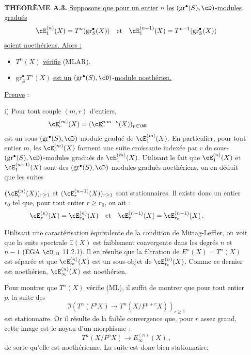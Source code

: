 \bigskip

\noindent
\textbf{THEOR\`EME A.3.} \underline{Supposons que pour un entier} $n$ \underline{les} $(\mathrm{gr}^{\bullet}(S), \cD)$-\underline{modules gradu\'es}
\[
\cE_1^{(n)}(X) = T^n(\mathrm{gr}_S^{\bullet}(X)) \quad \text{et} \quad \cE_1^{(n-1)}(X) = T^{n-1}(\mathrm{gr}_S^{\bullet}(X))
\]
\underline{soient noeth\'eriens. Alors :}
\begin{itemize}
\item[(i)] $T^n(X)$ \underline{v\'erifie} (MLAR),
\item[(ii)] $\mathrm{gr}_S^{\bullet}\,T^n(X)$ \underline{est un} $(\mathrm{gr}^{\bullet}(S), \cD)$-\underline{module noeth\'erien.}
\end{itemize}

\smallskip

\noindent
\underline{Preuve} :

i) Pour tout couple $(m,r)$ d'entiers,
\[
\cE_r^{(m)}(X) = (\cE_r^{p,m-p}(X))_{p \in \bN}\hspace*{3cm}
\]
est un sous-$(\mathrm{gr}^{\bullet}(S), \cD)$-module gradu\'e de $\cE_1^{(m)}(X)$. En particulier, pour tout entier $m$, les $\cE_r^{(m)}(X)$ forment une suite croissante index\'ee par $r$ de sous-$(\mathrm{gr}^{\bullet}(S), \cD)$-modules gradu\'es de $\cE_1^{(m)}(X)$. Utilisant le fait que $\cE_1^{(n)}(X)$ et $\cE_1^{(n-1)}(X)$ sont des $(\mathrm{gr}^{\bullet}(S), \cD)$-modules gradu\'es noeth\'eriens, on en d\'eduit que les suites

\newpage

$(\cE_r^{(n)}(X))_{r \geq 1}$ et $(\cE_r^{(n-1)}(X))_{r \geq 1}$ sont stationnaires. Il existe donc un entier $r_0$ tel que, pour tout entier $r \geq r_0$, on ait :
\[
\cE_r^{(n)}(X) = \cE_{r_0}^{(n)}(X) \quad \text{et} \quad \cE_r^{(n-1)}(X) = \cE_{r_0}^{(n-1)}(X)\,.\hspace*{1cm}
\]

Utilisant une caract\'erisation \'equivalente de la condition de Mittag-Leffler, on voit que la suite spectrale $\mathbb{E}(X)$ est faiblement convergente dans les degr\'es $n$ et $n-1$ (EGA $\cO_{\mathrm{III}}$ 11.2.1). Il en r\'esulte que la filtration de $E^n(X) = T^n(X)$ est s\'epar\'ee et que $\cE_{\infty}^{(n)}(X)$ est un sous-objet de $\cE_{r_0}^{(n)}(X)$. Comme ce dernier est noeth\'erien, $\cE_{\infty}^{(n)}(X)$ est noeth\'erien.

Pour montrer que $T^n(X)$ v\'erifie (ML), il suffit de montrer que pour tout entier $p$, la suite des
\[
\Im(T^n(F^p X) \rightarrow T^n(X/F^{p+r} X))_{r \geq 1}
\]
est stationnaire. Or il r\'esulte de la faible convergence que, pour $r$ assez grand, cette image est le noyau d'un morphisme :
\[
T^n(X/F^p X) \longrightarrow E_{\infty}^{(n)}(X)\,,
\]
de sorte qu'elle est noeth\'erienne. La suite est donc bien stationnaire.

